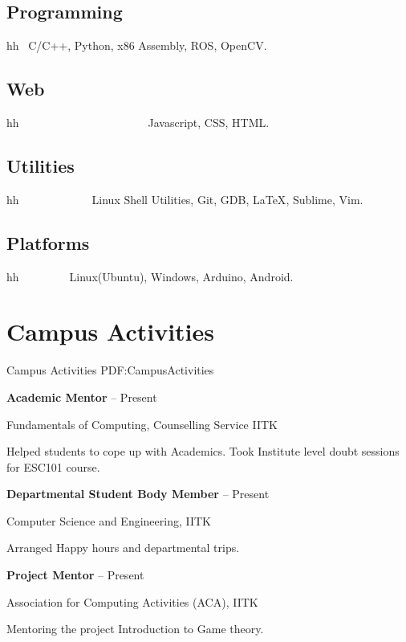 \documentclass[letterpaper,10pt,oneside]{article}
\begin{document}
\begin{body}
\subsection{Programming}
hh \ C/C++,
Python,
x86 Assembly,
ROS,
OpenCV.

\subsection{Web}
hh\ \ \ \ \ \ \ \ \ \ \ \ \ \ \ \ \ \ \ \ \ \ \  Javascript,
CSS,
HTML.

\subsection{Utilities}
hh\ \ \ \ \ \ \ \ \ \ \ \ \  Linux Shell Utilities,
Git,
GDB,
{\LaTeX},
Sublime,
Vim.

\subsection{Platforms}
hh\ \ \ \ \ \ \ \ \ Linux(Ubuntu),
Windows,
Arduino,
Android.

\section
{Campus Activities}
{Campus Activities}
{PDF:CampusActivities}

{\textbf{Academic Mentor}}
\hfill
{} --
Present

\GapNoBreak
\BulletItem
Fundamentals of Computing, Counselling Service IITK
\begin{detail}
\SubBulletItem
Helped students to cope up with Academics.
\SubBulletItem
Took Institute level doubt sessions for ESC101 course.
\end{detail}

{\textbf{Departmental Student Body Member}}
\hfill
{} --
Present

\GapNoBreak
\BulletItem
Computer Science and Engineering, IITK
\begin{detail}
\SubBulletItem
Arranged Happy hours and departmental trips.
\end{detail}

{\textbf{Project Mentor}}
\hfill
{} --
Present

\GapNoBreak
\BulletItem
Association for Computing Activities (ACA), IITK
\begin{detail}
\SubBulletItem
Mentoring the project Introduction to Game theory.
\end{detail}


\end{body}
\end{document}
